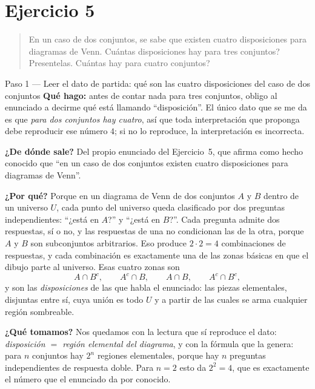 \documentclass[11pt]{article}
\begin{document}
\section*{Ejercicio 5}

\begin{quote}
En un caso de dos conjuntos, se sabe que existen cuatro disposiciones para diagramas de Venn.
Cuántas disposiciones hay para tres conjuntos? Presentelas. Cuántas hay para cuatro conjuntos?
\end{quote}

\begin{paso}{Paso 1 --- Leer el dato de partida: qué son las cuatro disposiciones del caso de dos conjuntos}
\textbf{Qué hago:} antes de contar nada para tres conjuntos, obligo al enunciado a decirme qué
está llamando ``disposición''. El único dato que se me da es que \emph{para dos conjuntos hay
cuatro}, así que toda interpretación que proponga debe reproducir ese número $4$; si no lo
reproduce, la interpretación es incorrecta.

\textbf{¿De dónde sale?} Del propio enunciado del Ejercicio~5, que afirma como hecho conocido
que ``en un caso de dos conjuntos existen cuatro disposiciones para diagramas de Venn''.

\textbf{¿Por qué?} Porque en un diagrama de Venn de dos conjuntos $A$ y $B$ dentro de un
universo $U$, cada punto del universo queda clasificado por dos preguntas independientes: ``¿está
en $A$?'' y ``¿está en $B$?''. Cada pregunta admite dos respuestas, sí o no, y las respuestas de
una no condicionan las de la otra, porque $A$ y $B$ son subconjuntos arbitrarios. Eso produce
$2\cdot 2=4$ combinaciones de respuestas, y cada combinación es exactamente una de las zonas
básicas en que el dibujo parte al universo. Esas cuatro zonas son
\[
A\cap B^{c},\qquad A^{c}\cap B,\qquad A\cap B,\qquad A^{c}\cap B^{c},
\]
y son las \emph{disposiciones} de las que habla el enunciado: las piezas elementales, disjuntas
entre sí, cuya unión es todo $U$ y a partir de las cuales se arma cualquier región sombreable.

\textbf{¿Qué tomamos?} Nos quedamos con la lectura que sí reproduce el dato: \emph{disposición
$=$ región elemental del diagrama}, y con la fórmula que la genera: para $n$ conjuntos hay $2^{n}$
regiones elementales, porque hay $n$ preguntas independientes de respuesta doble. Para $n=2$ esto
da $2^{2}=4$, que es exactamente el número que el enunciado da por conocido.
\end{paso}
\end{document}
